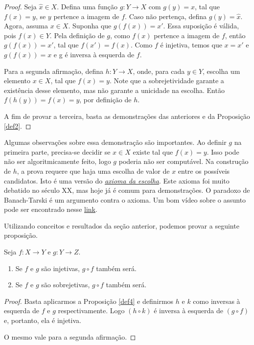 \begin{proof}
    Seja $\hat{x} \in X$. Defina uma função $g: Y \to X$ com $g(y) = x$, tal
    que $f(x) = y$, se $y$ pertence a imagem de $f$. Caso não pertença, defina
    $g(y) = \hat{x}$. Agora, assuma $x \in X$. Suponha que $g(f(x)) = x'$.
    Essa suposição é válida, pois $f(x) \in Y$. Pela definição de $g$, como
    $f(x)$ pertence a imagem de $f$, então $g(f(x)) = x'$, tal que $f(x') =
    f(x)$. Como $f$ é injetiva, temos que $x = x'$ e $g(f(x)) = x$ e g é
    inversa à esquerda de $f$. 

    Para a segunda afirmação, defina $h: Y \to X$, onde, para cada $y \in Y$,
    escolha um elemento $x \in X$, tal que $f(x) = y$. Note que a
    sobrejetividade garante a existência desse elemento, mas não garante a
    unicidade na escolha. Então $f(h(y)) = f(x) = y$, por definição de $h$.

    A fim de provar a terceira, basta as demonstrações das anteriores e da
    Proposição \ref{def2}. 
\end{proof}

Algumas observações sobre essa demonstração são importantes. Ao definir $g$ na
primeira parte, precisa-se decidir se $x \in X$ existe tal que $f(x) = y$.
Isso pode não ser algoritmicamente feito, logo $g$ poderia não ser computável.
Na construção de $h$, a prova requere que haja uma escolha de valor de $x$
entre os possíveis candidatos. Isto é uma versão do
\href{https://pt.wikipedia.org/wiki/Axioma_da_escolha#Enunciado}{\textit{axioma
da escolha}}. Este axioma foi muito debatido no século XX, mas hoje já é comum
para demonstrações. O paradoxo de Banach-Tarski é um argumento contra o
axioma. Um bom vídeo sobre o assunto pode ser encontrado nesse
\href{https://www.youtube.com/watch?v=s86-Z-CbaHA}{link}.

Utilizando conceitos e resultados da seção anterior, podemos provar a seguinte
proposição.

\begin{theorem}
    Seja $f: X \to Y$ e $g: Y \to Z$.
    \renewcommand{\labelenumi}{\Roman{enumi}}
    \begin{enumerate}
        \item Se $f$ e $g$ são injetivas, $g \circ f$ também será.
        \item Se $f$ e $g$ são sobrejetivas, $g \circ f$ também será.
    \end{enumerate}
\end{theorem}

\begin{proof}
    Basta aplicarmos a Proposição \ref{def4} e definirmos $h$ e $k$ como
    inversas à esquerda de $f$ e $g$ respectivamente. Logo $(h \circ k)$ é
    inversa à esquerda de  $(g \circ f)$ e, portanto, ela é injetiva.

    O mesmo vale para a segunda afirmação.
\end{proof}

